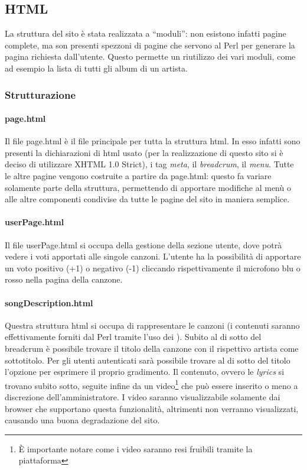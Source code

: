 \subsection{HTML}
La struttura del sito \`e stata realizzata a ``moduli'': non esistono infatti pagine complete, ma son presenti spezzoni di pagine che servono al Perl per generare la pagina richiesta dall'utente. Questo permette un riutilizzo dei vari moduli, come ad esempio la lista di tutti gli album di un artista.
\subsubsection{Strutturazione}
\paragraph*{page.html} Il file page.html \`e il file principale per tutta la struttura html. In esso infatti sono presenti la dichiarazioni di html usato (per la realizzazione di questo sito si \`e deciso di utilizzare XHTML 1.0 Strict), i tag \textit{meta}, il \textit{breadcrum}, il \textit{menu}. Tutte le altre pagine vengono costruite a partire da page.html: questo fa variare solamente parte della struttura, permettendo di apportare modifiche al men\`u o alle altre componenti condivise da tutte le pagine del sito in maniera semplice.

\paragraph{userPage.html} Il file userPage.html si occupa della gestione della sezione utente, dove potrà vedere i voti apportati alle singole canzoni. L'utente ha la possibilità di apportare un voto positivo (+1) o negativo (-1) cliccando rispettivamente il microfono blu o rosso nella pagina della canzone.

\paragraph{songDescription.html} Questra struttura html si occupa di rappresentare le canzoni (i contenuti saranno effettivamente forniti dal Perl tramite l'uso dei ). Subito al di sotto del breadcrum è possibile trovare il titolo della canzone con il rispettivo artista come sottotitolo. Per gli utenti autenticati sarà possibile trovare al di sotto del titolo l'opzione per esprimere il proprio gradimento. Il contenuto, ovvero le \textit{lyrics} si trovano subito sotto, seguite infine da un video\footnote{È importante notare come i video saranno resi fruibili tramite la piattaforma } che può essere inserito o meno a discrezione dell'amministratore. I video saranno visualizzabile solamente dai browser che supportano questa funzionalità, altrimenti non verranno visualizzati, causando una buona degradazione del sito.

